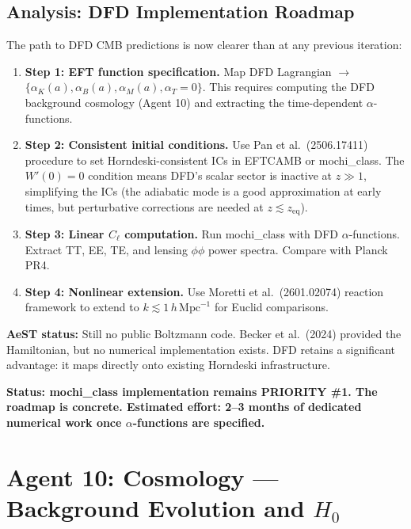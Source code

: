\documentclass[11pt,a4paper]{article}
\begin{document}
\subsection{Analysis: DFD Implementation Roadmap}

The path to DFD CMB predictions is now clearer than at any previous iteration:

\begin{enumerate}
\item \textbf{Step 1: EFT function specification.} Map DFD Lagrangian $\to$ $\{\alpha_K(a), \alpha_B(a), \alpha_M(a), \alpha_T = 0\}$. This requires computing the DFD background cosmology (Agent 10) and extracting the time-dependent $\alpha$-functions.

\item \textbf{Step 2: Consistent initial conditions.} Use Pan et al.\ (2506.17411) procedure to set Horndeski-consistent ICs in EFTCAMB or mochi\_class. The $W'(0) = 0$ condition means DFD's scalar sector is inactive at $z \gg 1$, simplifying the ICs (the adiabatic mode is a good approximation at early times, but perturbative corrections are needed at $z \lesssim z_\mathrm{eq}$).

\item \textbf{Step 3: Linear $C_\ell$ computation.} Run mochi\_class with DFD $\alpha$-functions. Extract TT, EE, TE, and lensing $\phi\phi$ power spectra. Compare with Planck PR4.

\item \textbf{Step 4: Nonlinear extension.} Use Moretti et al.\ (2601.02074) reaction framework to extend to $k \lesssim 1\,h\,\mathrm{Mpc}^{-1}$ for Euclid comparisons.
\end{enumerate}

\textbf{AeST status:} Still no public Boltzmann code. Becker et al.\ (2024) provided the Hamiltonian, but no numerical implementation exists. DFD retains a significant advantage: it maps directly onto existing Horndeski infrastructure.

\textbf{Status: mochi\_class implementation remains PRIORITY \#1. The roadmap is concrete. Estimated effort: 2--3 months of dedicated numerical work once $\alpha$-functions are specified.}

\section{Agent 10: Cosmology --- Background Evolution and $H_0$}
\end{document}
